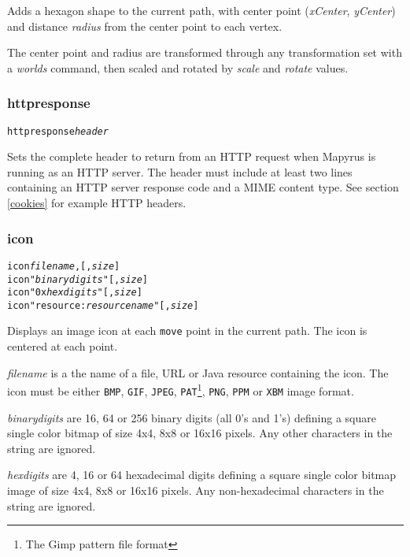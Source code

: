 Adds a hexagon shape to the current path, with center
point (\textit{xCenter}, \textit{yCenter}) and distance
\textit{radius}
from the center point to each vertex.

The center point and radius are transformed through any
transformation set with a \textit{worlds} command,
then scaled and rotated by \textit{scale}
and \textit{rotate} values.

\subsubsection{httpresponse}

\begin{alltt}
httpresponse \textit{header}
\end{alltt}

Sets the complete header to return from an HTTP request
when Mapyrus is running as an HTTP server.  The header
must include at least two lines containing an HTTP server
response code and a MIME content type.  See section \ref{cookies}
for example HTTP headers.

\subsubsection{icon}

\begin{alltt}
icon \textit{filename}, [, \textit{size}]
icon "\textit{binarydigits}" [, \textit{size}]
icon "0x\textit{hexdigits}" [, \textit{size}]
icon "resource:\textit{resourcename}" [, \textit{size}]
\end{alltt}

Displays an image icon at each \texttt{move} point in
the current path.  The icon is centered at each point.

\textit{filename} is a the name of a file, URL or Java resource
containing the icon.
The icon must be either \texttt{BMP}, \texttt{GIF}, \texttt{JPEG},
\texttt{PAT}\footnote{The Gimp pattern file format},
\texttt{PNG},
\texttt{PPM} or
\texttt{XBM} image format.

\textit{binarydigits} are 16, 64 or 256 binary digits (all 0's and 1's)
defining a square single color bitmap of size 4x4, 8x8 or 16x16 pixels.
Any other characters in the string are ignored.

\textit{hexdigits} are 4, 16 or 64 hexadecimal digits defining
a square single color bitmap image of size 4x4, 8x8 or 16x16 pixels.
Any non-hexadecimal characters in the string are ignored.

